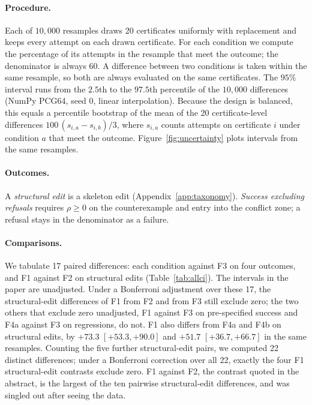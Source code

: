 \documentclass{article}
\begin{document}
\paragraph{Procedure.} Each of $10{,}000$ resamples draws 20 certificates
uniformly with replacement and keeps every attempt on each drawn certificate. For
each condition we compute the percentage of its attempts in the resample that
meet the outcome; the denominator is always 60. A difference between two
conditions is taken within the same resample, so both are always evaluated on the
same certificates. The $95\%$ interval runs from the $2.5$th to the $97.5$th
percentile of the $10{,}000$ differences (NumPy PCG64, seed 0, linear interpolation).
Because the design is balanced, this equals a percentile bootstrap of the mean of
the 20 certificate-level differences $100\,(s_{i,a}-s_{i,b})/3$, where $s_{i,a}$
counts attempts on certificate $i$ under condition $a$ that meet the outcome.
Figure~\ref{fig:uncertainty} plots intervals from the same resamples.

\paragraph{Outcomes.} A \emph{structural edit} is a skeleton edit
(Appendix~\ref{app:taxonomy}). \emph{Success excluding refusals} requires
$\rho \ge 0$ on the counterexample and entry into the conflict zone; a refusal
stays in the denominator as a failure.

\paragraph{Comparisons.} We tabulate 17 paired differences: each condition against
F3 on four outcomes, and F1 against F2 on structural edits
(Table~\ref{tab:allci}). The intervals in the paper are unadjusted. Under a
Bonferroni adjustment over these 17, the structural-edit differences of F1 from F2
and from F3 still exclude zero; the two others that exclude zero unadjusted, F1
against F3 on pre-specified success and F4a against F3 on regressions, do not.
F1 also differs from F4a and F4b on structural edits, by $+73.3$
$[+53.3,+90.0]$ and $+51.7$ $[+36.7,+66.7]$ in the same resamples. Counting the
five further structural-edit pairs, we computed 22 distinct differences; under a
Bonferroni correction over all 22, exactly the four F1 structural-edit contrasts
exclude zero. F1 against F2, the contrast quoted in the
abstract, is the largest of the ten pairwise structural-edit differences, and
was singled out after seeing the data.
\end{document}
